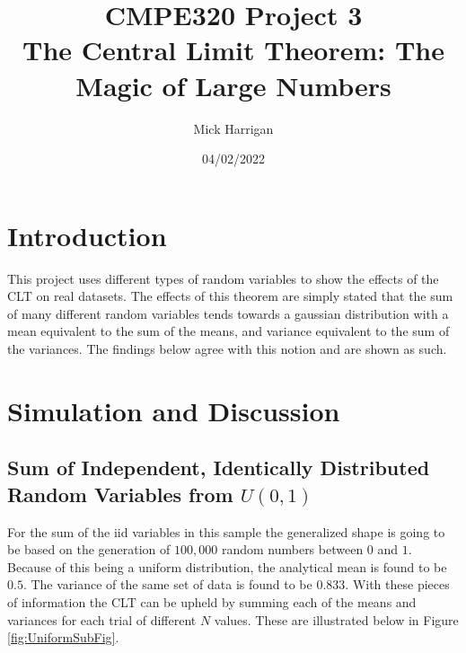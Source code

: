 \documentclass[a4paper, 11pt]{article}
\author{Mick Harrigan}
\date{04/02/2022}
\title{\textbf{CMPE320 Project 3}\\\medskip
\large \textbf{The Central Limit Theorem: The Magic of Large Numbers}}
\begin{document}
\maketitle
{}
\section{Introduction}
\label{sec:org058ef41}
This project uses different types of random variables to show the effects of the CLT on real datasets.
The effects of this theorem are simply stated that the sum of many different random variables tends towards a gaussian distribution with a mean equivalent to the sum of the means, and variance equivalent to the sum of the variances. The findings below agree with this notion and are shown as such.
\section{Simulation and Discussion}
\label{sec:org3d0db69}
\subsection{Sum of Independent, Identically Distributed Random Variables from \(U(0,1)\)}
\label{sec:org0023b57}
For the sum of the iid variables in this sample the generalized shape is going to be based on the generation of \(100,000\) random numbers between \(0\) and \(1\). Because of this being a uniform distribution, the analytical mean is found to be \(0.5\).
The variance of the same set of data is found to be \(0.833\). With these pieces of information the CLT can be upheld by summing each of the means and variances for each trial of different \(N\) values. These are illustrated below in Figure \ref{fig:UniformSubFig}.

\pagebreak
\end{document}
